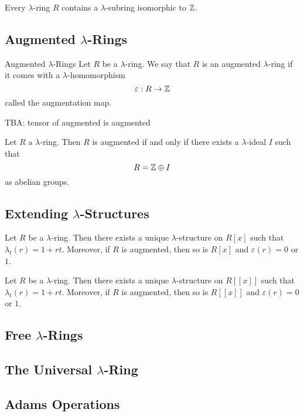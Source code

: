 \documentclass[a4paper]{article}
\begin{document}
\begin{prp}{}{} Every $\lambda$-ring $R$ contains a $\lambda$-subring isomorphic to $\mathbb{Z}$. 
\end{prp}

\subsection{Augmented $\lambda$-Rings}
\begin{defn}{Augmented $\lambda$-Rings}{} Let $R$ be a $\lambda$-ring. We say that $R$ is an augmented $\lambda$-ring if it comes with a $\lambda$-homomorphism $$\varepsilon:R\to\mathbb{Z}$$ called the augmentation map. 
\end{defn}

TBA: tensor of augmented is augmented

\begin{prp}{}{} Let $R$ a $\lambda$-ring. Then $R$ is augmented if and only if there exists a $\lambda$-ideal $I$ such that $$R=\mathbb{Z}\oplus I$$ as abelian groups. 
\end{prp}

\subsection{Extending $\lambda$-Structures}
\begin{prp}{}{} Let $R$ be a $\lambda$-ring. Then there exists a unique $\lambda$-structure on $R[x]$ such that $\lambda_t(r)=1+rt$. Moreover, if $R$ is augmented, then so is $R[x]$ and $\varepsilon(r)=0$ or $1$. 
\end{prp}

\begin{prp}{}{} Let $R$ be a $\lambda$-ring. Then there exists a unique $\lambda$-structure on $R[[x]]$ such that $\lambda_t(r)=1+rt$. Moreover, if $R$ is augmented, then so is $R[[x]]$ and $\varepsilon(r)=0$ or $1$. 
\end{prp}

\subsection{Free $\lambda$-Rings}

\subsection{The Universal $\lambda$-Ring}

\subsection{Adams Operations}
\end{document}
